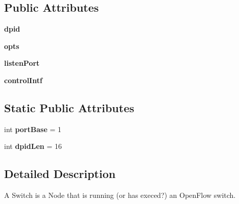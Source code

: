 \subsection*{Public Attributes}
\begin{DoxyCompactItemize}
\item 
\hypertarget{classmininet_1_1node_1_1Switch_a7d9ecaa2ae7a2a1894bd3d936d8fbbdc}{{\bfseries dpid}}\label{classmininet_1_1node_1_1Switch_a7d9ecaa2ae7a2a1894bd3d936d8fbbdc}

\item 
\hypertarget{classmininet_1_1node_1_1Switch_a9a98d55c899be0d4ca8bfb7cd2e53beb}{{\bfseries opts}}\label{classmininet_1_1node_1_1Switch_a9a98d55c899be0d4ca8bfb7cd2e53beb}

\item 
\hypertarget{classmininet_1_1node_1_1Switch_a73a2d105dc1887e10901bcdbc2fa186c}{{\bfseries listen\-Port}}\label{classmininet_1_1node_1_1Switch_a73a2d105dc1887e10901bcdbc2fa186c}

\item 
\hypertarget{classmininet_1_1node_1_1Switch_a783620ed7dc731301a91dc9f58698bbe}{{\bfseries control\-Intf}}\label{classmininet_1_1node_1_1Switch_a783620ed7dc731301a91dc9f58698bbe}

\end{DoxyCompactItemize}
\subsection*{Static Public Attributes}
\begin{DoxyCompactItemize}
\item 
\hypertarget{classmininet_1_1node_1_1Switch_a56ab4dc0fa30ebfe9df532d6e42e09a9}{int {\bfseries port\-Base} = 1}\label{classmininet_1_1node_1_1Switch_a56ab4dc0fa30ebfe9df532d6e42e09a9}

\item 
\hypertarget{classmininet_1_1node_1_1Switch_a0fbabf15d17e87acac0bdde26f69ea6c}{int {\bfseries dpid\-Len} = 16}\label{classmininet_1_1node_1_1Switch_a0fbabf15d17e87acac0bdde26f69ea6c}

\end{DoxyCompactItemize}


\subsection{Detailed Description}
\begin{DoxyVerb}A Switch is a Node that is running (or has execed?)
   an OpenFlow switch.\end{DoxyVerb}
 

